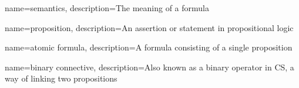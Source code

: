{
    name={semantics},
    description={The meaning of a formula}
}

{
    name={proposition},
    description={An assertion or statement in propositional logic}
}

{
    name={atomic formula},
    description={A formula consisting of a single proposition}
}

{
    name={binary connective},
    description={Also known as a binary operator in CS, a way of linking two propositions}
}

